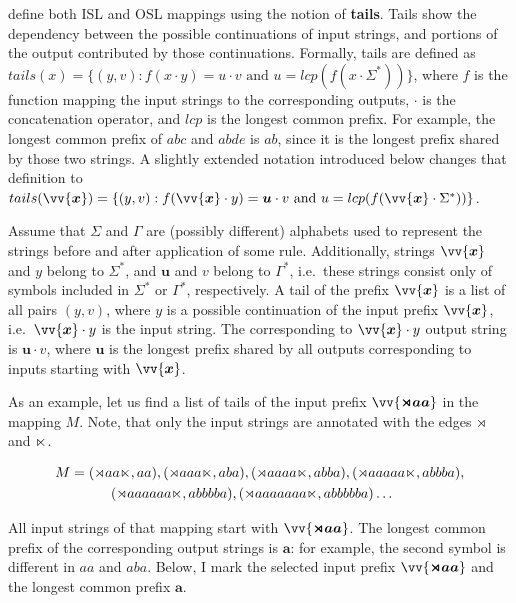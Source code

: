 \cite{ChandleeEtAl2014} define both ISL and OSL mappings using the notion of \textbf{tails}.
Tails show the dependency between the possible continuations of input strings, and portions of the output contributed by those continuations.
Formally, tails are defined as $tails(x) = \{(y, v) : f(x\cdot y) = u\cdot v \textrm{ and } u = lcp(f(x\cdot \Sigma^*))\}$, where $f$ is the function mapping the input strings to the corresponding outputs, $\cdot$ is the concatenation operator, and $lcp$ is the longest common prefix.
For example, the longest common prefix of $abc$ and $abde$ is $ab$, since it is the longest prefix shared by those two strings.
A slightly extended notation introduced below changes that definition to $tails(\vv{\bm{x}}) = \{(y, v) : f(\vv{\bm{x}}\cdot y) = \bm{u}\cdot v \textrm{ and } u = lcp(f(\vv{\bm{x}}\cdot \Sigma^*))\}$.



Assume that $\Sigma$ and $\Gamma$ are (possibly different) alphabets used to represent the strings before and after application of some rule.
Additionally, strings $\vv{\bm{x}}$ and $y$ belong to $\Sigma^*$, and $\bm{u}$ and $v$ belong to $\Gamma^*$, i.e.\ these strings consist only of symbols included in $\Sigma^*$ or $\Gamma^*$, respectively.
A tail of the prefix $\vv{\bm{x}}$ is a list of all pairs $(y, v)$, where $y$ is a possible continuation of the input prefix $\vv{\bm{x}}$, i.e.\ $\vv{\bm{x}}\cdot y$ is the input string.
The corresponding to $\vv{\bm{x}}\cdot y$ output string is $\bm{u}\cdot v$, where $\bm{u}$ is the longest prefix shared by all outputs corresponding to inputs starting with $\vv{\bm{x}}$.


As an example, let us find a list of tails of the input prefix $\vv{\bm{\bow aa}}$ in the mapping $M$.
Note, that only the input strings are annotated with the edges $\rtimes$ and $\ltimes$.


\begin{multline*}
M = (\bow aa\eow, aa), (\bow aaa\eow, aba), (\bow aaaa\eow, abba), (\bow aaaaa\eow, abbba), \\
 \qquad\quad \shoveleft{(\bow aaaaaa\eow, abbbba), (\bow aaaaaaa\eow, abbbbba)\dots}
\end{multline*}


All input strings of that mapping start with $\vv{\bm{\bow aa}}$.
The longest common prefix of the corresponding output strings is $\bm{a}$: for example, the second symbol is different in $aa$ and $aba$.
Below, I mark the selected input prefix $\vv{\bm{\bow aa}}$ and the longest common prefix $\bm{a}$.


